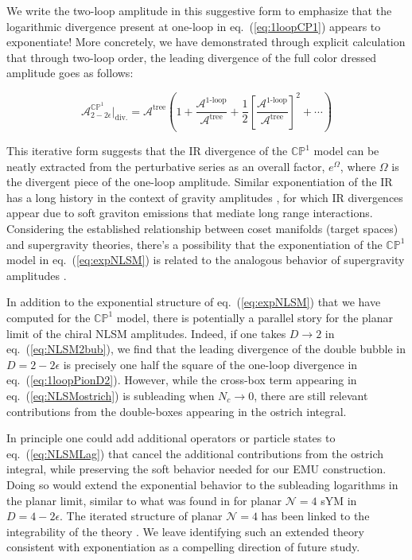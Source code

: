 \documentclass[11pt,letter]{article}
\def\eqn#1{eq.~(\ref{#1})}
\begin{document}
We write the two-loop amplitude in this suggestive form to emphasize that the logarithmic divergence present at one-loop in \eqn{eq:1loopCP1} appears to exponentiate! More concretely, we have demonstrated through explicit calculation that through two-loop order, the leading divergence of the full color dressed amplitude goes as follows:
\begin{eBox}
\begin{equation}\label{eq:expNLSM}
\mathcal{A}_{2-2\epsilon}^{\mathbb{CP}^1}\bigg|_{\text{div.}} = \mathcal{A}^{\text{tree}}\left( 1 + \frac{\mathcal{A}^{\text{1-loop}}}{ \mathcal{A}^{\text{tree}}} + \frac{1}{2}\left[\frac{\mathcal{A}^{\text{1-loop}}}{ \mathcal{A}^{\text{tree}}} \right]^2 + \cdots \right)
\end{equation}
\end{eBox}
This iterative form suggests that the IR divergence of the $\mathbb{CP}^1$ model can be neatly extracted from the perturbative series as an overall factor, $e^\Omega$, where $\Omega$ is the divergent piece of the one-loop amplitude. Similar exponentiation of the IR has a long history in the context of gravity amplitudes \cite{Weinberg:1965nx}, for which IR divergences appear due to soft graviton emissions that mediate long range interactions. Considering the established relationship \cite{deWit:1983xhu,deWit:1992cr,deWit:1992wf, Chiodaroli:2014xia} between coset manifolds (target spaces) and supergravity theories, there's a possibility that the exponentiation of the $\mathbb{CP}^1$ model in \eqn{eq:expNLSM} is related to the analogous behavior of supergravity amplitudes \cite{Naculich:2008ew,White:2011yy,DiVecchia:2019myk,DiVecchia:2019kta,Heissenberg:2021tzo}.

In addition to the exponential structure of \eqn{eq:expNLSM} that we have computed for the $\mathbb{CP}^1$ model, there is potentially a parallel story for the planar limit of the chiral NLSM amplitudes. Indeed, if one takes $D\rightarrow 2$ in \eqn{eq:NLSM2bub}, we find that the leading divergence of the double bubble in $D=2-2\epsilon$ is precisely one half the square of the one-loop divergence in \eqn{eq:1loopPionD2}. However, while the cross-box term appearing in \eqn{eq:NLSMostrich} is subleading when $N_c\rightarrow 0$, there are still relevant contributions from the double-boxes appearing in the ostrich integral. 

In principle one could add additional operators \cite{Elvang:2018dco} or particle states \cite{Cachazo:2016njl} to \eqn{eq:NLSMLag} that cancel the additional contributions from the ostrich integral, while preserving the soft behavior needed for our EMU construction. Doing so would extend the exponential behavior to the subleading logarithms in the planar limit, similar to what was found in \cite{Anastasiou:2003kj,Bern:2005iz} for planar $\mathcal{N}=4$ sYM in $D=4-2\epsilon$. The iterated structure of planar $\mathcal{N}=4$ has been linked to the integrability of the theory \cite{Sterman:2002qn,Minahan:2002ve,Bena:2003wd,Beisert:2003jj,Beisert:2003jb,Beisert:2003yb,Dolan:2003uh,Arutyunov:2003rg,Ryzhov:2004nz,Frolov:2005iq}. We leave identifying such an extended theory consistent with exponentiation as a compelling direction of future study.
\end{document}
